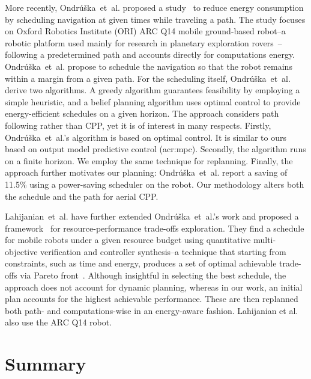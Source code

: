 More recently, Ondr\'{u}\v{s}ka~et~al. proposed a study~\citep{ondruska2015scheduled} to reduce energy consumption by scheduling navigation at given times while traveling a path. The study focuses on Oxford Robotics Institute (ORI) ARC Q14 mobile ground-based robot--a robotic platform used mainly for research in planetary exploration rovers~\citep{yeomans2017murfi}--following a predetermined path and accounts directly for computations energy. Ondr\'{u}\v{s}ka~et~al. propose to schedule the navigation so that the robot remains within a margin from a given path. For the scheduling itself, Ondr\'{u}\v{s}ka~et~al. derive two algorithms. A greedy algorithm guarantees feasibility by employing a simple heuristic, and a belief planning algorithm uses optimal control to provide energy-efficient schedules on a given horizon. The approach considers path following rather than CPP, yet it is of interest in many respects. Firstly, Ondr\'{u}\v{s}ka~et~al.'s algorithm is based on optimal control. It is similar to ours based on output model predictive control (\Gls{acr:mpc}). Secondly, the algorithm runs on a finite horizon. We employ the same technique for replanning. Finally, the approach further motivates our planning: Ondr\'{u}\v{s}ka~et~al. report a saving of 11.5\% using a power-saving scheduler on the robot. Our methodology alters both the schedule and the path for aerial CPP.

Lahijanian~et~al. have further extended Ondr\'{u}\v{s}ka~et~al.'s work and proposed a framework~\citep{lahijanian2018resource} for resource-performance trade-offs exploration. They find a schedule for mobile robots under a given resource budget using quantitative multi-objective verification and controller synthesis--a technique that starting from constraints, such as time and energy, produces a set of optimal achievable trade-offs via Pareto front~\citep{forejt2012pareto}. Although insightful in selecting the best schedule, the approach does not account for dynamic planning, whereas in our work, an initial plan accounts for the highest achievable performance. These are then replanned both path- and computations-wise in an energy-aware fashion. Lahijanian et al. also use the ARC Q14 robot.

\section{\color{red}Summary}

